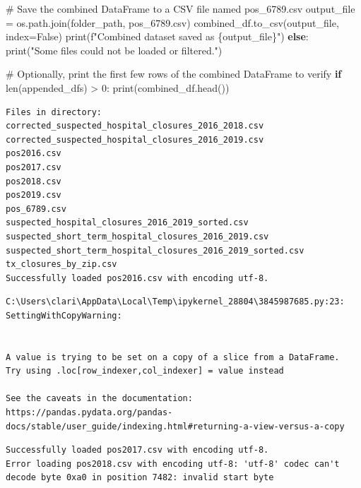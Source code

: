 \documentclass[
  letterpaper,
  DIV=11,
  numbers=noendperiod]{scrartcl}
\newenvironment{Shaded}{\begin{snugshade}}{\end{snugshade}}
\newcommand{\BuiltInTok}[1]{\textcolor[rgb]{0.00,0.23,0.31}{#1}}
\newcommand{\CommentTok}[1]{\textcolor[rgb]{0.37,0.37,0.37}{#1}}
\newcommand{\ControlFlowTok}[1]{\textcolor[rgb]{0.00,0.23,0.31}{\textbf{#1}}}
\newcommand{\DecValTok}[1]{\textcolor[rgb]{0.68,0.00,0.00}{#1}}
\newcommand{\NormalTok}[1]{\textcolor[rgb]{0.00,0.23,0.31}{#1}}
\newcommand{\OperatorTok}[1]{\textcolor[rgb]{0.37,0.37,0.37}{#1}}
\newcommand{\SpecialCharTok}[1]{\textcolor[rgb]{0.37,0.37,0.37}{#1}}
\newcommand{\SpecialStringTok}[1]{\textcolor[rgb]{0.13,0.47,0.30}{#1}}
\newcommand{\StringTok}[1]{\textcolor[rgb]{0.13,0.47,0.30}{#1}}
\newcommand{\VariableTok}[1]{\textcolor[rgb]{0.07,0.07,0.07}{#1}}
\begin{document}
\begin{Shaded}
\begin{Highlighting}[]
    \CommentTok{\# Save the combined DataFrame to a CSV file named \textquotesingle{}pos\_6789.csv\textquotesingle{}}
\NormalTok{    output\_file }\OperatorTok{=}\NormalTok{ os.path.join(folder\_path, }\StringTok{\textquotesingle{}pos\_6789.csv\textquotesingle{}}\NormalTok{)}
\NormalTok{    combined\_df.to\_csv(output\_file, index}\OperatorTok{=}\VariableTok{False}\NormalTok{)}
    \BuiltInTok{print}\NormalTok{(}\SpecialStringTok{f"Combined dataset saved as }\SpecialCharTok{\{}\NormalTok{output\_file}\SpecialCharTok{\}}\SpecialStringTok{"}\NormalTok{)}
\ControlFlowTok{else}\NormalTok{:}
    \BuiltInTok{print}\NormalTok{(}\StringTok{"Some files could not be loaded or filtered."}\NormalTok{)}

\CommentTok{\# Optionally, print the first few rows of the combined DataFrame to verify}
\ControlFlowTok{if} \BuiltInTok{len}\NormalTok{(appended\_dfs) }\OperatorTok{\textgreater{}} \DecValTok{0}\NormalTok{:}
    \BuiltInTok{print}\NormalTok{(combined\_df.head())}
\end{Highlighting}
\end{Shaded}

\begin{verbatim}
Files in directory:
corrected_suspected_hospital_closures_2016_2018.csv
corrected_suspected_hospital_closures_2016_2019.csv
pos2016.csv
pos2017.csv
pos2018.csv
pos2019.csv
pos_6789.csv
suspected_hospital_closures_2016_2019_sorted.csv
suspected_short_term_hospital_closures_2016_2019.csv
suspected_short_term_hospital_closures_2016_2019_sorted.csv
tx_closures_by_zip.csv
Successfully loaded pos2016.csv with encoding utf-8.
\end{verbatim}

\begin{verbatim}
C:\Users\clari\AppData\Local\Temp\ipykernel_28804\3845987685.py:23: SettingWithCopyWarning:


A value is trying to be set on a copy of a slice from a DataFrame.
Try using .loc[row_indexer,col_indexer] = value instead

See the caveats in the documentation: https://pandas.pydata.org/pandas-docs/stable/user_guide/indexing.html#returning-a-view-versus-a-copy
\end{verbatim}

\begin{verbatim}
Successfully loaded pos2017.csv with encoding utf-8.
Error loading pos2018.csv with encoding utf-8: 'utf-8' codec can't decode byte 0xa0 in position 7482: invalid start byte
\end{verbatim}
\end{document}
